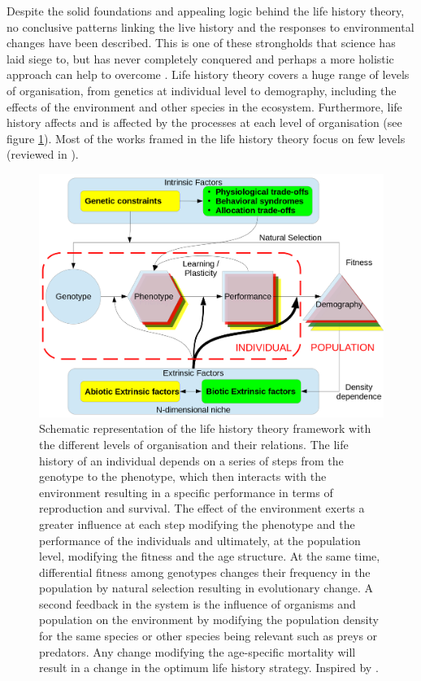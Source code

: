 Despite the solid foundations and appealing logic behind the life history
theory, no conclusive patterns linking the live history and the responses to
environmental changes have been described. This is one of these strongholds
that science has laid siege to, but has never completely conquered and perhaps a
more holistic approach can help to overcome \citep[p.~269--274]{levins1985}.
Life history theory covers a huge range of levels of organisation, from genetics
at individual level to demography, including the effects of the environment and
other species in the ecosystem. Furthermore, life history affects and is
affected by the processes at each level of organisation (see figure
\ref{fig:fig1.1}). Most of the works framed in the life history theory focus on
few levels (reviewed in \citet{Stearns2000}).


\begin{figure}
\centering
\includegraphics[width=\textwidth]{./Figures/intro/esquemaLH.png}
\caption[LH schema]{
Schematic representation of the life history theory framework with the
different levels of organisation and their relations.
The life history of an individual depends on a series of steps from the
genotype to the phenotype, which then interacts with the environment resulting
in a specific performance in terms of reproduction and survival. The effect of
the environment exerts a greater influence at each step modifying the phenotype
and the performance of the individuals and ultimately, at the population level,
modifying the fitness and the age structure.
At the same time, differential fitness among genotypes changes their frequency
in the population by natural selection resulting in evolutionary change. A
second feedback in the system is the influence of organisms and population
on the environment by modifying the population density for the same
species or other species being relevant such as preys or predators. Any change
modifying the age-specific mortality will result in a change in the optimum
life history strategy. Inspired by \citet{Ricklefs2002}.
}
\label{fig:fig1.1}
\end{figure}


